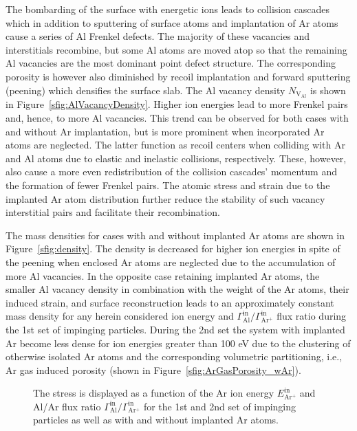 \documentclass[12pt,a4paper,preprint,superscriptaddress]{revtex4-1}
\begin{document}
The bombarding of the surface with energetic ions leads to collision cascades which in addition to sputtering of surface atoms and implantation of Ar atoms cause a series of Al Frenkel defects. The majority of these vacancies and interstitials recombine, but some Al atoms are moved atop so that the remaining Al vacancies are the most dominant point defect structure. The corresponding porosity is however also diminished by recoil implantation and forward sputtering (peening) which densifies the surface slab. The Al vacancy density $N_\mathrm{V_\mathrm{Al}}$ is shown in Figure~\ref{sfig:AlVacancyDensity}. Higher ion energies lead to more Frenkel pairs and, hence, to more Al vacancies. This trend can be observed for both cases with and without Ar implantation, but is more prominent when incorporated Ar atoms are neglected. The latter function as recoil centers when colliding with Ar and Al atoms due to elastic and inelastic collisions, respectively. These, however, also cause a more even redistribution of the collision cascades' momentum and the formation of fewer Frenkel pairs. The atomic stress and strain due to the implanted Ar atom distribution further reduce the stability of such vacancy interstitial pairs and facilitate their recombination. 

The mass densities for cases with and without implanted Ar atoms are shown in Figure~\ref{sfig:density}. The density is decreased for higher ion energies in spite of the peening when enclosed Ar atoms are neglected due to the accumulation of more Al vacancies. In the opposite case retaining implanted Ar atoms, the smaller Al vacancy density in combination with the weight of the Ar atoms, their induced strain, and surface reconstruction leads to an approximately constant mass density for any herein considered ion energy and $\Gamma_\mathrm{Al}^\mathrm{in}/\Gamma_\mathrm{Ar^+}^\mathrm{in}$ flux ratio during the 1st set of impinging particles. During the 2nd set the system with implanted Ar become less dense for ion energies greater than 100 eV due to the clustering of otherwise isolated Ar atoms and the corresponding volumetric partitioning, i.e., Ar gas induced porosity (shown in Figure~\ref{sfig:ArGasPorosity_wAr}). 

\begin{figure}[t]
\hfill
{}
\caption{The stress is displayed as a function of the Ar ion energy $E_\mathrm{Ar^+}^\mathrm{in}$ and Al/Ar flux ratio $\Gamma_\mathrm{Al}^\mathrm{in}/\Gamma_\mathrm{Ar^+}^\mathrm{in}$ for the 1st and 2nd set of impinging particles as well as with and without implanted Ar atoms.}
\label{fig:stress}
\end{figure}
\end{document}
